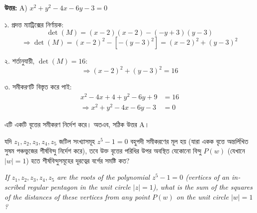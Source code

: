 \documentclass[12pt, a4paper]{article}
\begin{document}
\vspace{0.5em}
\begin{tcolorbox}[answerbox]
    \textbf{\color{success} উত্তর:} A) $x^2 + y^2 - 4x - 6y - 3 = 0$
\end{tcolorbox}
\vspace{1em}

\begin{tcolorbox}[solutionbox={সমাধান (Solution)}]
    \noindent
    ১. প্রদত্ত ম্যাট্রিক্সের নির্ণায়ক: 
    \[ \det(M) = (x - 2)(x - 2) - (-y + 3)(y - 3) \]
    \[ \Rightarrow \det(M) = (x - 2)^2 - [-(y - 3)^2] = (x - 2)^2 + (y - 3)^2 \]
    
    \vspace{0.5em}
    ২. শর্তানুযায়ী, $\det(M) = 16$:
    \[ \Rightarrow (x - 2)^2 + (y - 3)^2 = 16 \]
    
    \vspace{0.5em}
    ৩. সমীকরণটি বিস্তৃত করে পাই:
    \begin{align*}
        x^2 - 4x + 4 + y^2 - 6y + 9 &= 16 \\
        \Rightarrow x^2 + y^2 - 4x - 6y - 3 &= 0
    \end{align*}
    
    \vspace{0.5em}
    এটি একটি বৃত্তের সমীকরণ নির্দেশ করে। অতএব, সঠিক উত্তর A।
\end{tcolorbox}

\vspace{2em}

\begin{tcolorbox}[questionbox={প্রশ্ন (Question) 43}]
    \noindent
    যদি $z_1, z_2, z_3, z_4, z_5$ জটিল সংখ্যাসমূহ $z^5 - 1 = 0$ বহুপদী সমীকরণের মূল হয় (যারা একক বৃত্তে অন্তর্লিখিত সুষম পঞ্চভুজের শীর্ষবিন্দু নির্দেশ করে), তবে উক্ত বৃত্তের পরিধির উপর অবস্থিত যেকোনো বিন্দু $P(w)$ (যেখানে $|w| = 1$) হতে শীর্ষবিন্দুসমূহের দূরত্বের বর্গের সমষ্টি কত?
    
    \vspace{0.8em}
    \begin{english}
    \noindent\textit{\color{darkgray}
    If $z_1, z_2, z_3, z_4, z_5$ are the roots of the polynomial $z^5 - 1 = 0$ (vertices of an inscribed regular pentagon in the unit circle $|z|=1$), what is the sum of the squares of the distances of these vertices from any point $P(w)$ on the unit circle $|w| = 1$?
    }
    \end{english}
\end{tcolorbox}
\end{document}
